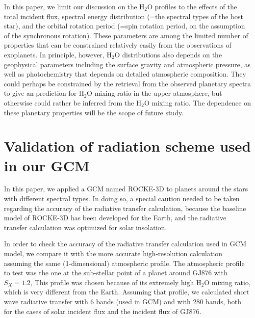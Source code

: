 \documentclass[11pt,numberedappendix,twocolappendix,]{emulateapj}
\def\water{H$_2$O }
\begin{document}
In this paper, we limit our discussion on the \water profiles to the effects of the total incident flux, spectral energy distribution (=the spectral types of the host star), and the orbital rotation period (=spin rotation period, on the assumption of the synchronous rotation). 
These parameters are among the limited number of properties that can be constrained relatively easily from the observations of exoplanets. 
In principle, however, \water distributions also depends on the geophysical parameters including the surface gravity and atmospheric pressure, as well as photochemistry that depends on detailed atmospheric composition. 
They could perhaps be constrained by the retrieval from the observed planetary spectra to give an prediction for \water mixing ratio in the upper atmosphere, but  otherwise could rather be inferred from the \water mixing ratio. 
The dependence on these planetary properties will be the scope of future study. 





\acknowledgments




\appendix


\section{Validation of radiation scheme used in our GCM}
\label{ap:radiation}

In this paper, we applied a GCM named ROCKE-3D to planets around the stars with different spectral types. 
In doing so, a special caution needed to be taken regarding the accuracy of the radiative transfer calculation, because the baseline model of ROCKE-3D has been developed for the Earth, and the radiative transfer calculation was optimized for solar insolation. 

In order to check the accuracy of the radiative transfer calculation used in GCM model, we compare it with the more accurate high-resolution calculation assuming the same (1-dimensional) atmospheric profile. 
The atmospheric profile to test was the one at the sub-stellar point of a planet around GJ876 with $S_X=1.2$, 
This profile was chosen because of its extremely high \water mixing ratio, which is very different from the Earth. 
Assuming that profile, we calculated short wave radiative transfer with 6 bands (used in GCM) and with 280 bands, both for the cases of solar incident flux and the incident flux of GJ876. 
\end{document}
